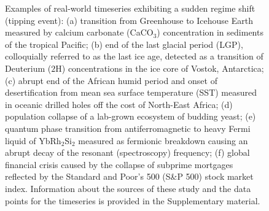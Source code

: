 \documentclass[../main.tex]{subfiles}
\begin{document}
\begin{figure}[H]
\begin{subfigure}[b]{0.325\textwidth}
        \label{fig1.1.6}
    \end{subfigure}
    \caption{Examples of real-world timeseries exhibiting a sudden regime shift (tipping event): (a) transition from Greenhouse to Icehouse Earth measured by calcium carbonate (CaCO$_3$) concentration in sediments of the tropical Pacific; (b) end of the last glacial period (LGP), colloquially referred to as the last ice age, detected as a transition of Deuterium ($2$H) concentrations in the ice core of Vostok, Antarctica; (c) abrupt end of the African humid period and onset of desertification from mean sea surface temperature (SST) measured in oceanic drilled holes off the cost of North-East Africa; (d) population collapse of a lab-grown ecosystem of budding yeast; (e) quantum phase transition from antiferromagnetic to heavy Fermi liquid of YbRh$_2$Si$_2$ measured as fermionic breakdown causing an abrupt decay of the resonant (spectroscopy) frequency; (f) global financial crisis caused by the collapse of subprime mortgages reflected by the Standard and Poor's 500 (S\&P 500) stock market index.
    Information about the sources of these study and the data points for the timeseries is provided in the Supplementary material.}
    \label{fig1.1}
\end{figure}
\end{document}
